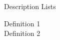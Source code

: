 \documentclass[\string~/GitHub/sthlmNordBeamerTheme/sthlmNordLightDemo.tex]{subfiles}
\begin{document}
\begin{frame}[fragile]{Description Lists}
	\begin{description}
		\item[Definition 1] \lipsum[1][1]
		\item[Definition 2] \lipsum[1][2]
	\end{description}


\end{frame}
\end{document}

